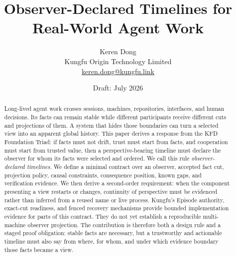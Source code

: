 \documentclass[11pt]{article}
\title{Observer-Declared Timelines for Real-World Agent Work}
\author{Keren Dong\\Kungfu Origin Technology Limited\\\href{mailto:keren.dong@kungfu.link}{keren.dong@kungfu.link}}
\date{Draft: July 2026}
\begin{document}
\maketitle

\begin{abstract}
Long-lived agent work crosses sessions, machines, repositories, interfaces,
and human decisions. Its facts can remain stable while different participants
receive different cuts and projections of them. A system that hides those
boundaries can turn a selected view into an apparent global history. This paper
derives a response from the KFD Foundation Triad: if facts must not drift,
trust must start from facts, and cooperation must start from trusted value,
then a perspective-bearing timeline must declare the observer for whom its
facts were selected and ordered. We call this rule \emph{observer-declared
timelines}. We define a minimal contract over an observer, accepted fact cut,
projection policy, causal constraints, consequence position, known gaps, and
verification evidence. We then derive a second-order requirement: when the
component presenting a view restarts or changes, continuity of perspective must
be evidenced rather than inferred from a reused name or live process. Kungfu's
Episode authority, exact-cut readiness, and fenced recovery mechanisms provide
bounded implementation evidence for parts of this contract. They do not yet
establish a reproducible multi-machine observer projection. The contribution is
therefore both a design rule and a staged proof obligation: stable facts are
necessary, but a trustworthy and actionable timeline must also say from where,
for whom, and under which evidence boundary those facts became a view.
\end{abstract}












\end{document}
